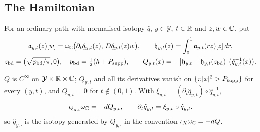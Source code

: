 \subsection{The Hamiltonian}\label{sec:pln-ham}

\begin{construction}\label{cons:pln-hamiltonian}
For an ordinary path with normalised isotopy $\hat q$, $y\in\mathcal Y$, $t\in\mathbb{R}$ and $z,w\in\mathbb{C}$, put
\begin{gather*}
 \mathfrak a_{y,t}(z)[w]=\omega_{\mathbb{C}}\bigl(\partial_t\hat q_{y,t}(z),\,D\hat q_{y,t}(z)w\bigr),\qquad
 \mathfrak h_{y,t}(z)=\int_0^1\mathfrak a_{y,t}(rz)[z]\,dr,\\
 z_{\rm bd}=\bigl(\sqrt{p_{\rm bd}/\pi},0\bigr),\quad p_{\rm bd}=\tfrac12(h+P_{\rm supp}),\qquad
 Q_{y,t}(x)=-\bigl[\mathfrak h_{y,t}-\mathfrak h_{y,t}(z_{\rm bd})\bigr]\bigl(\hat q_{y,t}^{-1}(x)\bigr).
\end{gather*}
\end{construction}

\begin{proposition}\label{prop:pln-hamiltonian}
$Q$ is $C^\infty$ on $\mathcal Y\times\mathbb{R}\times\mathbb{C}$; $Q_{y,t}$ and all its derivatives vanish on $\{\pi|x|^2>P_{\rm supp}\}$ for every
$(y,t)$, and $Q_{y,t}=0$ for $t\notin(0,1)$. With $\xi_{y,t}=(\partial_t\hat q_{y,t})\circ\hat q_{y,t}^{-1}$,
\[
 \iota_{\xi_{y,t}}\omega_{\mathbb{C}}=-dQ_{y,t},\qquad \partial_t\hat q_{y,t}=\xi_{y,t}\circ\hat q_{y,t},
\]
so $\hat q_{y,\cdot}$ is the isotopy generated by $Q_{y,\cdot}$ in the convention $\iota_X\omega_{\mathbb{C}}=-dQ$.
\end{proposition}

